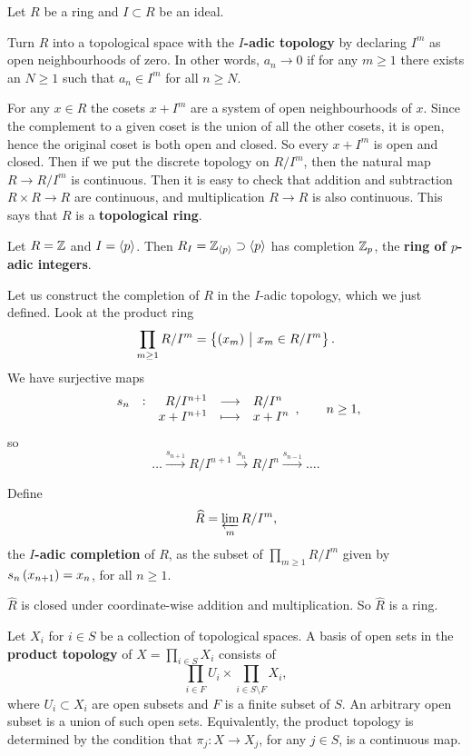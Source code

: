 Let $ R $ be a ring and $ I \subset R $ be an ideal.

\begin{definition}
Turn $ R $ into a topological space with the \textbf{$ I $-adic topology} by declaring $ I^m $ as open neighbourhoods of zero. In other words, $ a_n \to 0 $ if for any $ m \ge 1 $ there exists an $ N \ge 1 $ such that $ a_n \in I^m $ for all $ n \ge N $.
\end{definition}

For any $ x \in R $ the cosets $ x + I^m $ are a system of open neighbourhoods of $ x $. Since the complement to a given coset is the union of all the other cosets, it is open, hence the original coset is both open and closed. So every $ x + I^m $ is open and closed. Then if we put the discrete topology on $ R / I^m $, then the natural map $ R \to R / I^m $ is continuous. Then it is easy to check that addition and subtraction $ R \times R \to R $ are continuous, and multiplication $ R \to R $ is also continuous. This says that $ R $ is a \textbf{topological ring}.

\begin{example}
Let $ R = \mathbb{Z} $ and $ I = \left\langle p \right\rangle $. Then $ R_I = \mathbb{Z}_{\left\langle p \right\rangle} \supset \left\langle p \right\rangle $ has completion $ \mathbb{Z}_p $, the \textbf{ring of $ p $-adic integers}.
\end{example}

Let us construct the completion of $ R $ in the $ I $-adic topology, which we just defined. Look at the product ring
$$ \prod_{m \ge 1} R / I^m = \cbr{\br{x_m} \st x_m \in R / I^m}. $$
We have surjective maps
$$ \function[s_n]{R / I^{n + 1}}{R / I^n}{x + I^{n + 1}}{x + I^n}, \qquad n \ge 1, $$
so
$$ \dots \xrightarrow{s_{n + 1}} R / I^{n + 1} \xrightarrow{s_n} R / I^n \xrightarrow{s_{n - 1}} \dots. $$

\begin{definition}
Define
$$ \widehat{R} = \varprojlim_m R / I^m, $$
the \textbf{$ I $-adic completion} of $ R $, as the subset of $ \prod_{m \ge 1} R / I^m $ given by $ s_n\br{x_{n + 1}} = x_n $, for all $ n \ge 1 $.
\end{definition}

$ \widehat{R} $ is closed under coordinate-wise addition and multiplication. So $ \widehat{R} $ is a ring.


\begin{definition}
Let $ X_i $ for $ i \in S $ be a collection of topological spaces. A basis of open sets in the \textbf{product topology} of $ X = \prod_{i \in S} X_i $ consists of
$$ \prod_{i \in F} U_i \times \prod_{i \in S \setminus F} X_i, $$
where $ U_i \subset X_i $ are open subsets and $ F $ is a finite subset of $ S $. An arbitrary open subset is a union of such open sets. Equivalently, the product topology is determined by the condition that $ \pi_j : X \to X_j $, for any $ j \in S $, is a continuous map.
\end{definition}

